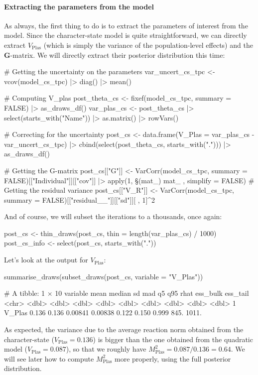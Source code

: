 \documentclass[a4paper,12pt,twoside]{article}
\begin{document}
\paragraph{Extracting the parameters from the model}
As always, the first thing to do is to extract the parameters of interest from the model.
Since the character-state model is quite straightforward, we can directly extract $V_{\text{Plas}}$ (which is simply the variance of the population-level effects) and the $\mathbf{G}$-matrix.
We will directly extract their posterior distribution this time:
\begin{Rinput}
# Getting the uncertainty on the parameters
var_uncert_cs_tpc <-
    vcov(model_cs_tpc) |>
    diag() |>
    mean()

# Computing V_plas
post_theta_cs <- 
    fixef(model_cs_tpc, summary = FALSE) |>
    as_draws_df()
var_plas_cs <-
    post_theta_cs |>
    select(starts_with("Name")) |>
    as.matrix() |>
    rowVars()

# Correcting for the uncertainty
post_cs <-
    data.frame(V_Plas = var_plas_cs - var_uncert_cs_tpc) |>
    cbind(select(post_theta_cs, starts_with("."))) |>
    as_draws_df()

# Getting the G-matrix
post_cs[["G"]] <-
    VarCorr(model_cs_tpc, summary = FALSE)[["Individual"]][["cov"]] |>
    apply(1, \§§(mat_) { mat_ }, simplify = FALSE)
# Getting the residual variance
post_cs[["V_R"]] <-
    VarCorr(model_cs_tpc, summary = FALSE)[["residual__"]][["sd"]][ , 1]^2
\end{Rinput}
And of course, we will subset the iterations to a thousands, once again:
\begin{Rinput}
post_cs <- thin_draws(post_cs, thin = length(var_plas_cs) / 1000)
post_cs_info <- select(post_cs, starts_with("."))
\end{Rinput}
Let's look at the output for $V_{\text{Plas}}$:
\begin{Rinput}
summarise_draws(subset_draws(post_cs, variable = "V_Plas"))
\end{Rinput}
\begin{Routput}
# A tibble: 1 × 10
  variable  mean median      sd     mad    q5   q95  rhat ess_bulk ess_tail
  <chr>    <dbl>  <dbl>   <dbl>   <dbl> <dbl> <dbl> <dbl>    <dbl>    <dbl>
1 V_Plas   0.136  0.136 0.00841 0.00838 0.122 0.150 0.999     845.    1011.
\end{Routput}
As expected, the variance due to the average reaction norm obtained from the character-state ($V_{\text{Plas}} = 0.136$) is bigger than the one obtained from the quadratic model ($V_{\text{Plas}} = 0.087$), so that we roughly have $M^{2}_{\text{Plas}} =  0.087 / 0.136 = 0.64$.
We will see later how to compute $M^{2}_{\text{Plas}}$ more properly, using the full posterior distribution.
\end{document}
